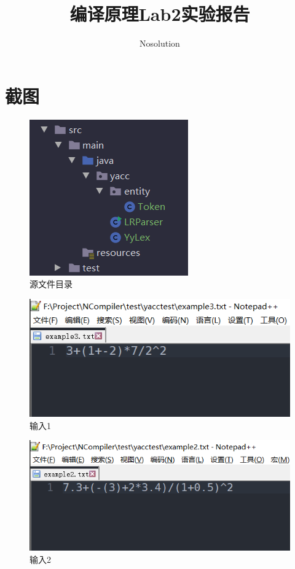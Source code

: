 \documentclass[a4paper]{ctexart} %
\title{编译原理Lab2实验报告}
\author{Nosolution}
\date{}
\begin{document}
	\maketitle

	\section{截图}
	\begin{figure}[h]
	\centering
	\includegraphics[scale=0.64]{../picture/yacc/源文件目录.png}
	\caption[l]{源文件目录}
	\end{figure}

	\begin{figure}[h]
		\centering
		\includegraphics[scale=0.4]{../picture/yacc/输入1.png}
		\caption[l]{输入1}
	\end{figure}

	\begin{figure}[h]
		\centering
		\includegraphics[scale=0.4]{../picture/yacc/输入2.png}
		\caption[l]{输入2}
	\end{figure}
	\newpage
\end{document}
